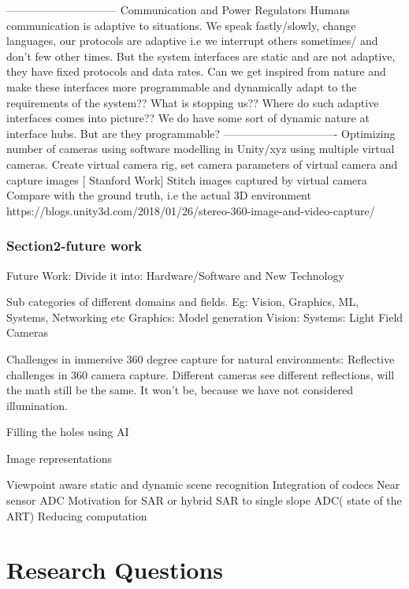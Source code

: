 ------------------------------
Communication and Power Regulators
Humans communication is adaptive to situations. We speak fastly/slowly, change languages, our protocols are adaptive i.e we interrupt others sometimes/ and don’t few other times. But the system interfaces are static and are not adaptive, they have fixed protocols and data rates. Can we get inspired from nature and make these interfaces more programmable and dynamically adapt to the requirements of the system?? What is stopping us?? 
Where do such adaptive interfaces comes into picture?? We do have some sort of dynamic nature at interface hubs. But are they programmable?
-------------------------------
Optimizing number of cameras using software modelling in Unity/xyz using multiple virtual cameras. 
Create virtual camera rig, set camera parameters of virtual camera and capture images [ Stanford Work]
Stitch images captured by virtual camera 
Compare with the ground truth, i.e the actual 3D environment 
https://blogs.unity3d.com/2018/01/26/stereo-360-image-and-video-capture/

\subsection{Section2-future work}


Future Work:
Divide it into:
Hardware/Software and New Technology

Sub categories of different domains and fields. 
Eg: Vision, Graphics, ML, Systems, Networking etc
Graphics: Model generation 
Vision: 
Systems: Light Field Cameras

Challenges in immersive 360 degree capture for natural environments:
Reflective challenges in 360 camera capture. Different cameras see different reflections, will the math still be the same. It won’t be, because we have not considered illumination. 

Filling the holes using AI

Image representations

Viewpoint aware static and dynamic scene recognition
Integration of codecs 
Near sensor ADC
Motivation for SAR or hybrid SAR to single slope ADC( state of the ART)
Reducing computation 

\chapter{Research Questions}


